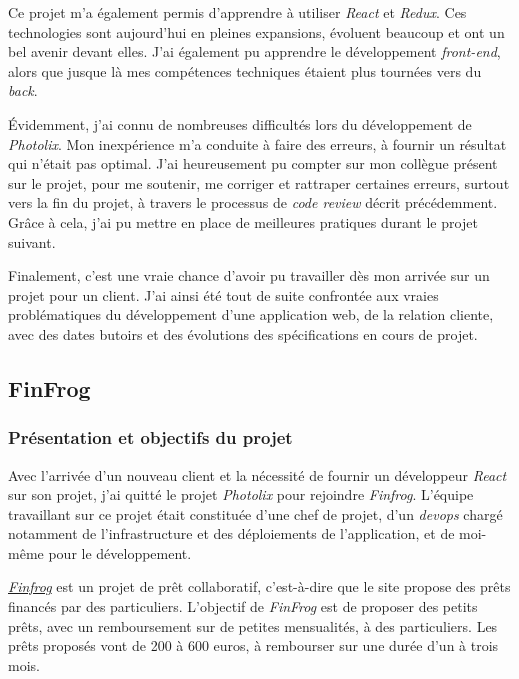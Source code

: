 \bigskip

Ce projet m'a également permis d'apprendre à utiliser \emph{React} et
\emph{Redux}. Ces technologies sont aujourd'hui en pleines expansions,
évoluent beaucoup et ont un bel avenir devant elles. J'ai également pu
apprendre le développement \emph{front-end}, alors que jusque là mes
compétences techniques étaient plus tournées vers du \emph{back}.

\bigskip

Évidemment, j'ai connu de nombreuses difficultés lors du développement
de \emph{Photolix}. Mon inexpérience m'a conduite à faire des erreurs, à
fournir un résultat qui n'était pas optimal. J'ai heureusement pu
compter sur mon collègue présent sur le projet, pour me soutenir, me
corriger et rattraper certaines erreurs, surtout vers la fin du projet,
à travers le processus de \emph{code review} décrit précédemment. Grâce
à cela, j'ai pu mettre en place de meilleures pratiques durant le projet
suivant.

\bigskip

Finalement, c'est une vraie chance d'avoir pu travailler dès mon arrivée
sur un projet pour un client. J'ai ainsi été tout de suite confrontée
aux vraies problématiques du développement d'une application web, de la
relation cliente, avec des dates butoirs et des évolutions des
spécifications en cours de projet.

\subsection{FinFrog}\label{finfrog}

\subsubsection{Présentation et objectifs du
projet}\label{pruxe9sentation-et-objectifs-du-projet-1}

\bigskip

Avec l'arrivée d'un nouveau client et la nécessité de fournir un
développeur \emph{React} sur son projet, j'ai quitté le projet
\emph{Photolix} pour rejoindre \emph{Finfrog}. L'équipe travaillant sur
ce projet était constituée d'une chef de projet, d'un \emph{devops}
chargé notamment de l'infrastructure et des déploiements de
l'application, et de moi-même pour le développement.

\bigskip

\href{https://finfrog.fr/}{\emph{Finfrog}} est un projet de prêt
collaboratif, c'est-à-dire que le site propose des prêts financés par
des particuliers. L'objectif de \emph{FinFrog} est de proposer des
petits prêts, avec un remboursement sur de petites mensualités, à des
particuliers. Les prêts proposés vont de 200 à 600 euros, à rembourser
sur une durée d'un à trois mois.

